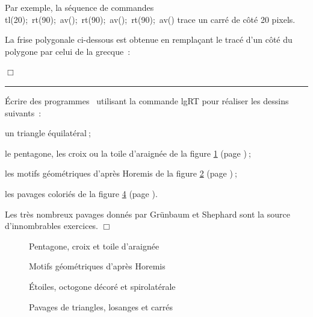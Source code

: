  Par exemple, la séquence de commandes {\idt tl(20);\ rt(90);\ av();\ 
rt(90);\ av();\ rt(90);\ av()} trace un carré de côté
20 pixels.
\begin{exemple}[Grecque polygonale]{\rm
La frise polygonale ci-dessous est ob\-te\-nue en remplaçant le tracé
d'un côté du polygone par celui de la grecque~:

\vspace{\baselineskip}


\noindent $\Box$ }\end{exemple}
\noindent \rule{137mm}{0.1mm} %
\begin{exercices}{Écrire des programmes \python\  utilisant la commande {\idt lgRT}
pour réaliser les dessins suivants~:

\tiret un triangle équilatéral$\:$;

\tiret le pentagone, les croix ou la toile d'araignée de la figure \ref{fig:PtCrCrTa} (page \pageref{fig:PtCrCrTa})$\:$;

\tiret les motifs géométriques d'après Horemis \cite{horemis} de la figure \ref{fig:horemis} (page \pageref{fig:horemis})$\:$;

\tiret les pavages coloriés de la figure \ref{fig:pavtrilo} (page \pageref{fig:pavtrilo}).

Les très nombreux pavages donnés par Grünbaum et Shephard \cite{grunbaum} sont la source
d'innombrables exercices.
\noindent $\Box$}\end{exercices}
\begin{figure}[htbp]
 \caption{Pentagone, croix et toile d'araignée}\label{fig:PtCrCrTa}
\end{figure}
\begin{figure}[htbp]
 \caption{Motifs géométriques d'après Horemis}\label{fig:horemis}
\end{figure}
\begin{figure}[htbp]
 \caption{Étoiles, octogone décoré et spirolatérale}\label{fig:etocsp}
\end{figure}
\begin{figure}[htbp]
 \caption{Pavages de triangles, losanges et carrés}\label{fig:pavtrilo}
\end{figure}

